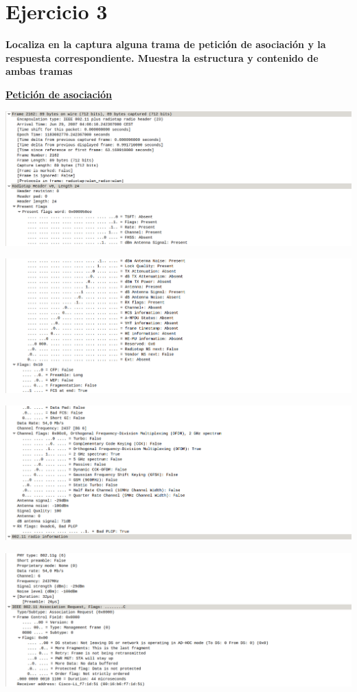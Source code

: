 \documentclass{article}
\begin{document}
\section{Ejercicio 3}

\textbf{Localiza en la captura alguna trama de petición de asociación y la respuesta
correspondiente. Muestra la estructura y contenido de ambas tramas}

\textbf{\underline{Petición de asociación}}

\begin{center}
\includegraphics[scale=0.3]{WLAN/assreq1.png}
\end{center}
\begin{center}
\includegraphics[scale=0.3]{WLAN/assreq2.png}
\end{center}
\begin{center}
\includegraphics[scale=0.3]{WLAN/assreq3.png}
\end{center}
\begin{center}
\includegraphics[scale=0.3]{WLAN/assreq4.png}
\end{center}
\end{document}
